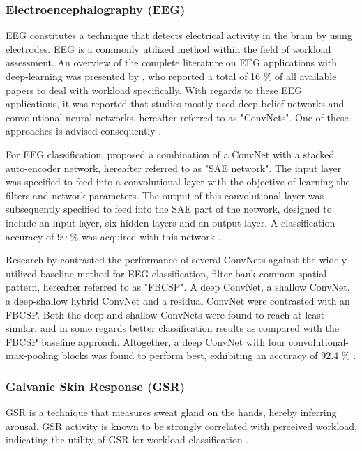 \documentclass[12pt]{article}
\begin{document}
\subsubsection{Electroencephalography (EEG)}
EEG constitutes a technique that detects electrical activity in the brain by using electrodes. EEG is a commonly utilized method within the field of workload assessment. An overview of the complete literature on EEG applications with deep-learning was presented by , who reported a total of 16 \% of all available papers to deal with workload specifically. With regards to these EEG applications, it was reported that studies mostly used deep belief networks and convolutional neural networks, hereafter referred to as "ConvNets". One of these approaches is advised consequently \cite{craik2019deep}.

For EEG classification,  proposed a combination of a ConvNet with a stacked auto-encoder network, hereafter referred to as "SAE network". The input layer was specified to feed into a convolutional layer with the objective of learning the filters and network parameters. The output of this convolutional layer was subsequently specified to feed into the SAE part of the network, designed to include an input layer, six hidden layers and an output layer. A classification accuracy of 90 \% was acquired with this network \cite{tabar2016novel}. 

Research by  contrasted the performance of several ConvNets against the widely utilized baseline method for EEG classification, filter bank common spatial pattern, hereafter referred to as "FBCSP". A deep ConvNet, a shallow ConvNet, a deep-shallow hybrid ConvNet and a residual ConvNet were contrasted with an FBCSP. Both the deep and shallow ConvNets were found to reach at least similar, and in some regards better classification results as compared with the FBCSP baseline approach. Altogether, a deep ConvNet with four convolutional-max-pooling blocks was found to perform best, exhibiting an accuracy of 92.4 \% \cite{schirrmeister2017deep}.

\subsubsection{Galvanic Skin Response (GSR)}
GSR is a technique that measures sweat gland on the hands, hereby inferring arousal. GSR activity is known to be strongly correlated with perceived workload, indicating the utility of GSR for workload classification \cite{shi2007galvanic}. 
\end{document}
